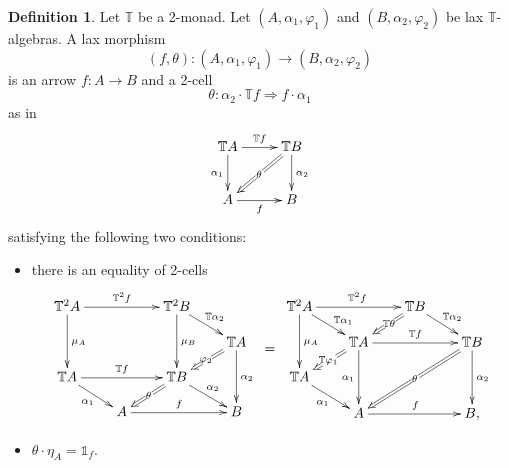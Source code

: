 \documentclass[12pt,leqno]{amsart}
\theoremstyle{definition}
\newtheorem{definition}[theorem]{Definition}
\def\T{\mathbb{T}}
\def\id{{\mathbb 1}}
\newcommand{\4}{\texttt{4}}
\renewcommand{\phi}{\varphi}
\begin{document}
\begin{definition}\label{definition:lax_morphism_in_text} Let $\T$ be a 2-monad.
  Let $(A,\alpha_1,\phi_1)$ and $(B,\alpha_2,\phi_2)$ be lax
  $\T$-algebras. A lax morphism
  $$(f,\theta)\colon (A,\alpha_1,\phi_1)\to (B,\alpha_2,\phi_2)$$ is an
arrow $f\colon A\to B$ and a 2-cell
    $$\theta\colon \alpha_2\cdot \T f  \Rightarrow f\cdot \alpha_1$$
    as in
    \begin{equation}
\xymatrix@R=2.5em@C=2.5em{
\T A \ar[r]^{\T f} \ar[d]_{\alpha_1} 
& \T B\ar[d]^{\alpha_2} \ar@{=>}[dl]|{\theta\rule{.1em}{0pt}}
\\
A \ar[r]_{f} & B
}
\end{equation}
satisfying the following two conditions:
\begin{itemize}[topsep=0pt, partopsep=0pt, itemsep=0pt, itemindent=-1.5em]
\item[(i)] there is an equality of 2-cells
\begin{equation}\label{equation:lax-lax-cube}
\xymatrix@R=1.2em@C=2em{
\T^2 A \ar[rr]^{\T^2 f}\ar[dd]^{\mu_A}
&&\T^2  B \ar[dd]^{\mu_B} \ar[rd]^{\T\alpha_2}
\\
&&& \T  A  \ar[dd]^{\alpha_2}
\ar@{=>}[ld]|{\phi_2\rule{.1em}{0pt}}
\\
\T  A \ar[rr]^{\T f} \ar[rd]_{\alpha_1} && \T B
\ar@{=>}[ld]|{\theta\rule{.1em}{0pt}}
\ar[dr]^{\alpha_2}
\\
&A \ar[rr]^{f} && B
}
\hskip .5em
\raisebox{-3em}{$=$} \hskip .5em
\xymatrix@R=1.2em@C=2em{
\T^2  A \ar[rr]^{\T^2 f}\ar[dd]^{\mu_A} 
\ar[rd]^(.6){\T \alpha_1}   && 
\T B  \ar[rd]^{\T \alpha_2} \ar@{=>}[ld]|(.45){\T{\theta\rule{.1em}{0pt}}}
\\
&\T A  \ar[rr]^{\T f}   \ar[dd]_{\alpha_1}
\ar@{=>}[ld]|{\T\phi_1\rule{.1em}{0pt}}
&& \T B 
\ar[dd]^{\alpha_2} 
\ar@{=>}[lldd]|{\theta\rule{.1em}{0pt}}
\\
\T A \ar[rd]_{\alpha_1} &&
\\
& A \ar[rr]^{f} && B,
}
\end{equation}
    \item[(ii)] $\theta\cdot\eta_A=\id_f$.
\end{itemize}
\end{definition}
\end{document}

